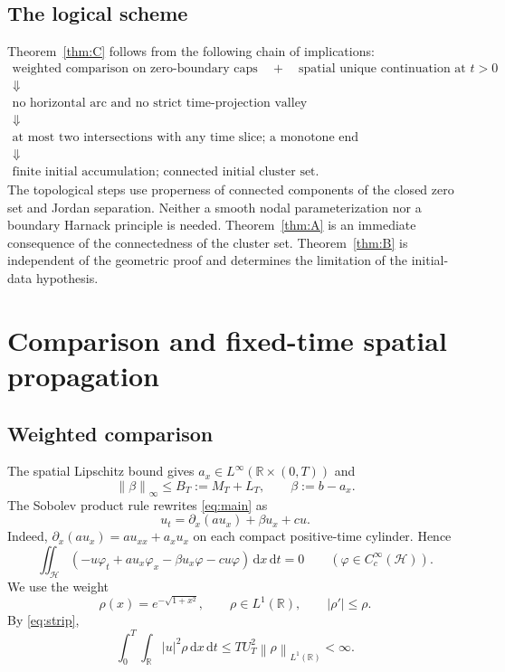\documentclass[11pt,reqno]{amsart}
\numberwithin{equation}{section}
\theoremstyle{definition}
\theoremstyle{remark}
\newcommand{\R}{\mathbb R}
\newcommand{\HH}{\mathcal H}
\newcommand{\dd}{\,\mathrm d}
\newcommand{\norm}[1]{\left\lVert#1\right\rVert}
\begin{document}
\subsection{The logical scheme}
Theorem~\ref{thm:C} follows from the following chain of implications:
\[
\begin{gathered}
 \text{weighted comparison on zero-boundary caps}
 \quad+\quad
 \text{spatial unique continuation at }t>0
 \\
 \Downarrow
 \\
 \text{no horizontal arc and no strict time-projection valley}
 \\
 \Downarrow
 \\
 \text{at most two intersections with any time slice; a monotone end}
 \\
 \Downarrow
 \\
 \text{finite initial accumulation; connected initial cluster set}.
\end{gathered}
\]
The topological steps use properness of connected components of the
closed zero set and Jordan separation.  Neither a smooth nodal
parameterization nor a boundary Harnack principle is needed.
Theorem~\ref{thm:A} is an immediate consequence of the connectedness of
the cluster set.  Theorem~\ref{thm:B} is independent of the geometric
proof and determines the limitation of the initial-data hypothesis.

\section{Comparison and fixed-time spatial propagation}\label{sec:analytic}
\subsection{Weighted comparison}
The spatial Lipschitz bound gives $a_x\in L^\infty(\R\times(0,T))$ and
\begin{equation}\label{eq:betabound}
 \norm{\beta}_\infty\leq B_T:=M_T+L_T,
 \qquad \beta:=b-a_x.
\end{equation}
The Sobolev product rule rewrites \eqref{eq:main} as
\begin{equation}\label{eq:div}
 u_t=\partial_x(a u_x)+\beta u_x+cu.
\end{equation}
Indeed, $\partial_x(a u_x)=a u_{xx}+a_xu_x$ on each compact positive-time cylinder. Hence
\begin{equation}\label{eq:weak}
 \iint_\HH(-u\varphi_t+a u_x\varphi_x-\beta u_x\varphi-cu\varphi)
 \dd x\dd t=0
 \qquad(\varphi\in C_c^\infty(\HH)).
\end{equation}
We use the weight
\begin{equation}\label{eq:rho}
 \rho(x)=e^{-\sqrt{1+x^2}},\qquad
 \rho\in L^1(\R),\qquad |\rho'|\leq\rho.
\end{equation}
By \eqref{eq:strip},
\[
 \int_0^T\int_\R |u|^2\rho\dd x\dd t
 \leq TU_T^2\norm{\rho}_{L^1(\R)}<\infty.
\]
\end{document}

